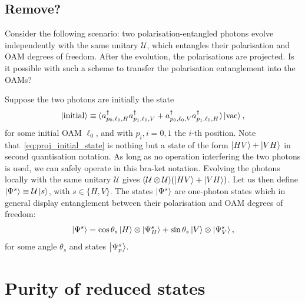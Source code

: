 \documentclass[
aps, pra, authorblock, superscriptaddress, twocolumn,
	10pt]{revtex4-1}
\newcommand{\on}[1]{\operatorname{#1}}
\newcommand{\parTitle}[1]{\noindent{\color{Mahogany}(\emph{#1})}}
\newcommand{\calU}{{\mathcal{U}}}
\begin{document}
\parTitle{Quantum walks!}

\subsection{Remove?}
Consider the following scenario: two polarisation-entangled photons evolve independently with the same unitary $\mathcal U$, which entangles their polarisation and OAM degrees of freedom. After the evolution, the polarisations are projected. Is it possible with such a scheme to transfer the polarisation entanglement into the OAMs?

Suppose the two photons are initially the state
\begin{equation}
    \ket{\on{initial}}\equiv
    (a_{p_0,\ell_0,H}^\dagger
    a_{p_1,\ell_0,V}^\dagger +
    a_{p_0,\ell_0,V}^\dagger
    a_{p_1,\ell_0,H}^\dagger) \ket{\mathrm{vac}},
    \label{eq:proj_initial_state}
\end{equation}
for some initial OAM $\ell_0$, and with $p_i, i=0,1$ the $i$-th position.
Note that~\cref{eq:proj_initial_state} is nothing but a state of the form $\ket{HV}+\ket{VH}$ in second quantisation notation.
As long as no operation interfering the two photons is used, we can safely operate in this bra-ket notation.
Evolving the photons locally with the same unitary $\calU$ gives
$(\calU\otimes\calU)(\ket{HV}+\ket{VH})$.
Let us then define
$\ket{\Psi^s}\equiv\calU\ket s$, with $s\in\{H,V\}$.
The states $\ket{\Psi^s}$ are one-photon states which in general display entanglement between their polarisation and OAM degrees of freedom:
\begin{equation}
    \ket{\Psi^s}=
    \cos\theta_s \ket H\otimes\ket{\Psi^s_{H}} +
    \sin\theta_s \ket V\otimes\ket{\Psi^s_{V}},
\end{equation}
for some angle $\theta_s$ and states $\ket{\Psi^s_p}$.

\section{Purity of reduced states}
\label{sec:purity_reduced_states}
\end{document}
